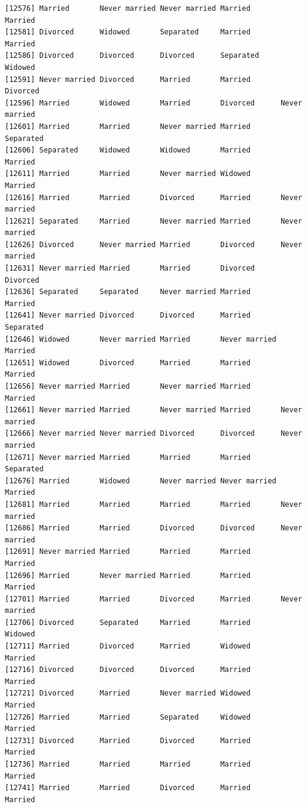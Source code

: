 \documentclass[
  letterpaper,
  DIV=11,
  numbers=noendperiod,
  oneside]{scrartcl}
\begin{document}
\begin{verbatim}
[12576] Married       Never married Never married Married       Married      
[12581] Divorced      Widowed       Separated     Married       Married      
[12586] Divorced      Divorced      Divorced      Separated     Widowed      
[12591] Never married Divorced      Married       Married       Divorced     
[12596] Married       Widowed       Married       Divorced      Never married
[12601] Married       Married       Never married Married       Separated    
[12606] Separated     Widowed       Widowed       Married       Married      
[12611] Married       Married       Never married Widowed       Married      
[12616] Married       Married       Divorced      Married       Never married
[12621] Separated     Married       Never married Married       Never married
[12626] Divorced      Never married Married       Divorced      Never married
[12631] Never married Married       Married       Divorced      Divorced     
[12636] Separated     Separated     Never married Married       Married      
[12641] Never married Divorced      Divorced      Married       Separated    
[12646] Widowed       Never married Married       Never married Married      
[12651] Widowed       Divorced      Married       Married       Married      
[12656] Never married Married       Never married Married       Married      
[12661] Never married Married       Never married Married       Never married
[12666] Never married Never married Divorced      Divorced      Never married
[12671] Never married Married       Married       Married       Separated    
[12676] Married       Widowed       Never married Never married Married      
[12681] Married       Married       Married       Married       Never married
[12686] Married       Married       Divorced      Divorced      Never married
[12691] Never married Married       Married       Married       Married      
[12696] Married       Never married Married       Married       Married      
[12701] Married       Married       Divorced      Married       Never married
[12706] Divorced      Separated     Married       Married       Widowed      
[12711] Married       Divorced      Married       Widowed       Married      
[12716] Divorced      Divorced      Divorced      Married       Married      
[12721] Divorced      Married       Never married Widowed       Married      
[12726] Married       Married       Separated     Widowed       Married      
[12731] Divorced      Married       Divorced      Married       Married      
[12736] Married       Married       Married       Married       Married      
[12741] Married       Married       Divorced      Married       Married      

\end{verbatim}
\end{document}
